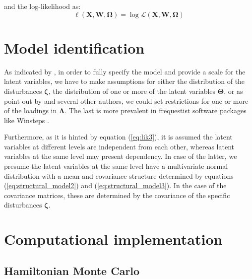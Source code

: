 \noindent and the log-likelihood as:
%
\begin{equation} \label{eq:loglik}
	\ell(\mathbf{X}, \mathbf{W}, \pmb{\Omega}) = \log \mathcal{L}(\mathbf{X}, \mathbf{W}, \pmb{\Omega})
\end{equation}


\section{Model identification} \label{sect:identification}

As indicated by \citet{Rabe_et_al_2004a}, in order to fully specify the model and provide a scale for the latent variables, we have to make assumptions for either the distribution of the disturbances $\pmb{\zeta}$, the distribution of one or more of the latent variables $\pmb{\Theta}$, or as point out by \citet{Fujimoto_2018b} and several other authors, we could set restrictions for one or more of the loadings in $\pmb{\Lambda}$. The last is more prevalent in frequestist software packages like Winsteps \cite{Winsteps2021}.

Furthermore, as it is hinted by equation (\ref{eq:lik3}), it is assumed the latent variables at different levels are independent from each other, whereas latent variables at the same level may present dependency. In case of the latter, we presume the latent variables at the same level have a multivariate normal distribution with a mean and covariance structure determined by equations (\ref{eq:structural_model2}) and (\ref{eq:structural_model3}). In the case of the covariance matrices, these are determined by the covariance of the specific disturbances $\pmb{\zeta}$.



\section{Computational implementation} \label{sect:comp_imp}

\subsection{Hamiltonian Monte Carlo}

